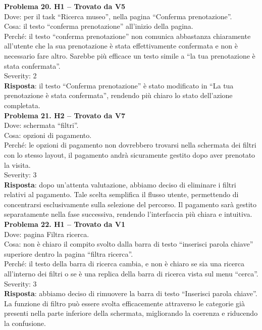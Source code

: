 \documentclass{article}
\begin{document}
\noindent \textbf{Problema 20. H1 – Trovato da V5} \\
Dove: per il task “Ricerca museo”, nella pagina “Conferma prenotazione”. \\
Cosa: il testo “conferma prenotazione” all’inizio della pagina. \\
Perché: il testo “conferma prenotazione” non comunica abbastanza chiaramente all’utente che la sua prenotazione è stata effettivamente confermata e non è necessario fare altro. Sarebbe più efficace un testo simile a “la tua prenotazione è stata confermata”. \\
Severity: 2 \\
\textbf{Risposta}: il testo “Conferma prenotazione” è stato modificato in “La tua prenotazione è stata confermata”, rendendo più chiaro lo stato dell’azione completata.\\

\noindent \textbf{Problema 21. H2 – Trovato da V7} \\
Dove: schermata “filtri”. \\
Cosa: opzioni di pagamento. \\
Perché: le opzioni di pagamento non dovrebbero trovarsi nella schermata dei filtri con lo stesso layout, il pagamento andrà sicuramente gestito dopo aver prenotato la visita. \\
Severity: 3 \\
\textbf{Risposta}: dopo un'attenta valutazione, abbiamo deciso di eliminare i filtri relativi al pagamento. Tale scelta semplifica il flusso utente, permettendo di concentrarsi esclusivamente sulla selezione del percorso. Il pagamento sarà gestito separatamente nella fase successiva, rendendo l’interfaccia più chiara e intuitiva.\\

\noindent \textbf{Problema 22. H1 – Trovato da V1} \\
Dove: pagina Filtra ricerca. \\
Cosa: non è chiaro il compito svolto dalla barra di testo “inserisci parola chiave” superiore dentro la pagina “filtra ricerca”. \\
Perché: il testo della barra di ricerca cambia, e non è chiaro se sia una ricerca all’interno dei filtri o se è una replica della barra di ricerca vista sul menu “cerca”. \\
Severity: 3 \\
\textbf{Risposta}: abbiamo deciso di rimuovere la barra di testo “Inserisci parola chiave”. La funzione di filtro può essere svolta efficacemente attraverso le categorie già presenti nella parte inferiore della schermata, migliorando la coerenza e riducendo la confusione.\\
\end{document}
